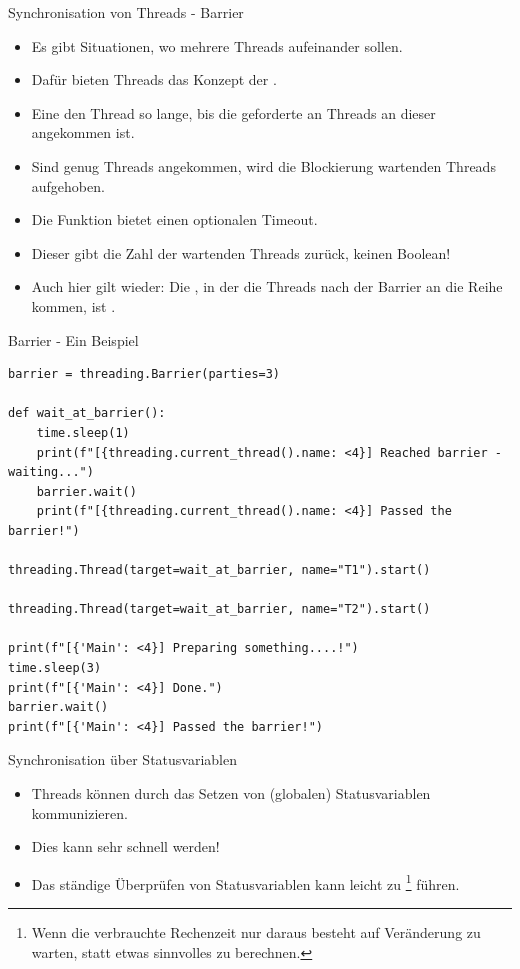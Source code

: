 \documentclass[12pt, aspectratio=169, usepdftitle=false]{beamer}
\newcommand{\pp}[1]{\lpl{#1}}
\begin{document}
\begin{frame}[fragile]{Synchronisation von Threads - Barrier}
	\begin{itemize}
		\item Es gibt Situationen, wo mehrere Threads aufeinander  sollen.
		\item Dafür bieten Threads das Konzept der \pp{Barrier}.
		\pause
		
		\item Eine \pp{Barrier}  den Thread so lange, bis die geforderte  an Threads an dieser angekommen ist.
		\pause
		
		\item Sind genug Threads angekommen, wird die Blockierung  wartenden Threads aufgehoben.
		\item[] Die \pp{.wait()} Funktion bietet einen optionalen Timeout.
		\item[] Dieser gibt die Zahl der wartenden Threads zurück, keinen Boolean!
		
		\pause
		\item Auch hier gilt wieder: Die , in der die Threads nach der Barrier an die Reihe kommen, ist .
	\end{itemize}
\end{frame}


\begin{frame}[fragile]{Barrier - Ein Beispiel}
	\begin{lstlisting}[language=pytiny]
barrier = threading.Barrier(parties=3)

def wait_at_barrier():
    time.sleep(1)
    print(f"[{threading.current_thread().name: <4}] Reached barrier - waiting...")
    barrier.wait()
    print(f"[{threading.current_thread().name: <4}] Passed the barrier!")

threading.Thread(target=wait_at_barrier, name="T1").start()

threading.Thread(target=wait_at_barrier, name="T2").start()

print(f"[{'Main': <4}] Preparing something....!")
time.sleep(3)
print(f"[{'Main': <4}] Done.")
barrier.wait()
print(f"[{'Main': <4}] Passed the barrier!")
	\end{lstlisting}
\end{frame}


\begin{frame}[fragile]{Synchronisation über Statusvariablen}
	\begin{itemize}
		\item Threads können durch das Setzen von (globalen) Statusvariablen kommunizieren.
		\pause
		
		\item Dies kann sehr schnell  werden!
		\pause
		\item Das ständige Überprüfen von Statusvariablen kann leicht zu \footnote{Wenn die verbrauchte Rechenzeit nur daraus besteht auf Veränderung zu warten, statt etwas sinnvolles zu berechnen.} führen.
	\end{itemize}
\end{frame}
\end{document}
